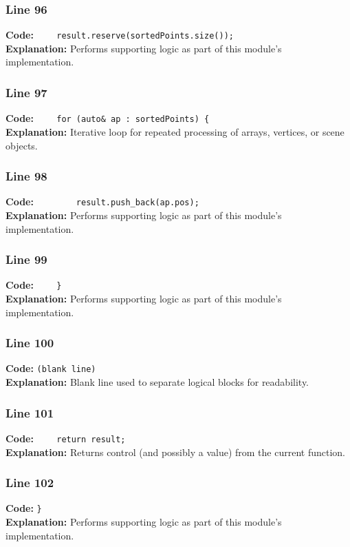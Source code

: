 \documentclass[11pt,a4paper]{article}
\begin{document}
\subsubsection*{Line 96}
\textbf{Code:} \verb|    result.reserve(sortedPoints.size());|\\
\textbf{Explanation:} Performs supporting logic as part of this module's implementation.

\subsubsection*{Line 97}
\textbf{Code:} \verb|    for (auto& ap : sortedPoints) {|\\
\textbf{Explanation:} Iterative loop for repeated processing of arrays, vertices, or scene objects.

\subsubsection*{Line 98}
\textbf{Code:} \verb|        result.push_back(ap.pos);|\\
\textbf{Explanation:} Performs supporting logic as part of this module's implementation.

\subsubsection*{Line 99}
\textbf{Code:} \verb|    }|\\
\textbf{Explanation:} Performs supporting logic as part of this module's implementation.

\subsubsection*{Line 100}
\textbf{Code:} \texttt{(blank line)}\\
\textbf{Explanation:} Blank line used to separate logical blocks for readability.

\subsubsection*{Line 101}
\textbf{Code:} \verb|    return result;|\\
\textbf{Explanation:} Returns control (and possibly a value) from the current function.

\subsubsection*{Line 102}
\textbf{Code:} \verb|}|\\
\textbf{Explanation:} Performs supporting logic as part of this module's implementation.
\end{document}
